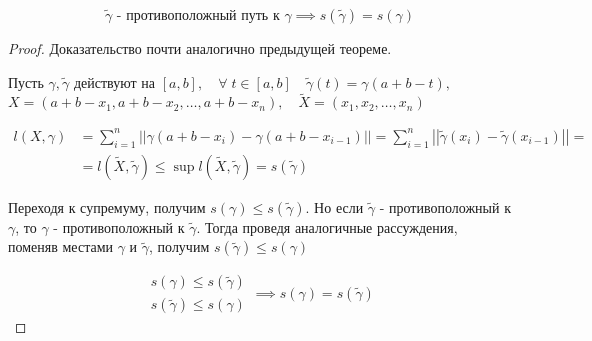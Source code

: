 \documentclass[../main.tex]{subfiles}
\begin{document}
\begin{thm}
    \[ \tilde{ \gamma }\text{ - противоположный путь к } \gamma \implies s( \tilde{ \gamma })=s\left( \gamma \right)\]
\end{thm}
\begin{proof}
    Доказательство почти аналогично предыдущей теореме. 

    Пусть \( \gamma , \tilde{ \gamma }\) действуют на \( \left[ a,b\right],\quad \forall \; t \in \left[ a,b\right]\quad \tilde{ \gamma }\left( t\right)= \gamma \left( a+b-t\right),\)
    \( X=(a+b-x_1,a+b-x_2, \dots,a+b-x_n),\quad \tilde{ X}=(x_1, x_2, \dots, x_n)\)

    \begin{equation*}
        \begin{aligned}
            l \left( X, \gamma \right)&= \sum\limits_{ i=1}^{ n} \left| \left| \gamma \left( a+b-x_i\right)- \gamma \left( a+b-x_{i-1}\right)\right|\right|= \sum\limits_{ i=1}^{ n} \left| \left| \tilde{ \gamma }\left( x_i\right)- \tilde{ \gamma }\left( x_{i-1}\right)\right|\right|=\\
            &=l( \tilde{ X}, \tilde{ \gamma }) \leq \sup\limits_{ } l( \tilde{ X}, \tilde{ \gamma })=s( \tilde{ \gamma } )
        \end{aligned}
    \end{equation*}
    
    Переходя к супремуму, получим \( s\left( \gamma \right) \leq s\left( \tilde{ \gamma }\right)\). Но если \( \tilde{ \gamma }\) - противоположный к \( \gamma \), то \( \gamma \) - противоположный к \( \tilde{ \gamma }\). Тогда проведя аналогичные рассуждения, поменяв местами \( \gamma \) и \( \tilde{ \gamma }\), получим \( s( \tilde{ \gamma }) \leq s\left( \gamma \right)\)

    \begin{equation*}
        \begin{aligned}
            s\left( \gamma \right) \leq s\left( \tilde{ \gamma }\right)\\ 
            s\left( \tilde{ \gamma }\right) \leq s\left( \gamma \right)
        \end{aligned}
        \implies 
        s\left( \gamma \right)=s\left( \tilde{ \gamma }\right)
    \end{equation*}
\end{proof}
\end{document}
